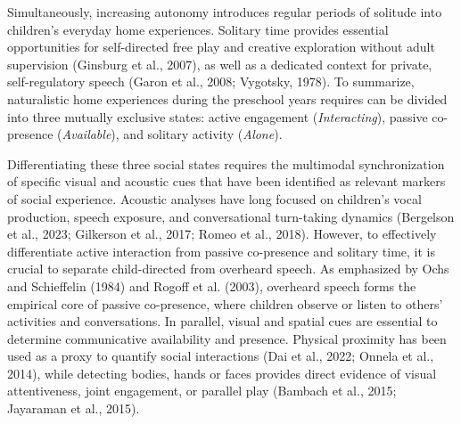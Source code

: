 \documentclass[
  english,
  12pt,
  man,floatsintext]{apa6}
\begin{document}
Simultaneously, increasing autonomy introduces regular periods of solitude into children's everyday home experiences. Solitary time provides essential opportunities for self-directed free play and creative exploration without adult supervision (Ginsburg et al., 2007), as well as a dedicated context for private, self-regulatory speech (Garon et al., 2008; Vygotsky, 1978). To summarize, naturalistic home experiences during the preschool years requires can be divided into three mutually exclusive states: active engagement (\emph{Interacting}), passive co-presence (\emph{Available}), and solitary activity (\emph{Alone}).

Differentiating these three social states requires the multimodal synchronization of specific visual and acoustic cues that have been identified as relevant markers of social experience. Acoustic analyses have long focused on children's vocal production, speech exposure, and conversational turn-taking dynamics (Bergelson et al., 2023; Gilkerson et al., 2017; Romeo et al., 2018). However, to effectively differentiate active interaction from passive co-presence and solitary time, it is crucial to separate child-directed from overheard speech. As emphasized by Ochs and Schieffelin (1984) and Rogoff et al. (2003), overheard speech forms the empirical core of passive co-presence, where children observe or listen to others' activities and conversations. In parallel, visual and spatial cues are essential to determine communicative availability and presence. Physical proximity has been used as a proxy to quantify social interactions (Dai et al., 2022; Onnela et al., 2014), while detecting bodies, hands or faces provides direct evidence of visual attentiveness, joint engagement, or parallel play (Bambach et al., 2015; Jayaraman et al., 2015).
\end{document}
